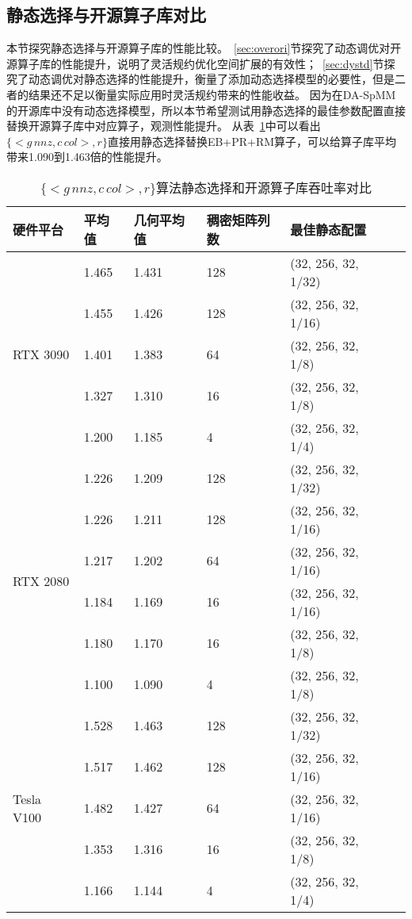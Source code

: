 \subsection{静态选择与开源算子库对比}
本节探究静态选择与开源算子库的性能比较。~\ref{sec:overori}节探究了动态调优对开源算子库的性能提升，说明了灵活规约优化空间扩展的有效性；~\ref{sec:dystd}节探究了动态调优对静态选择的性能提升，衡量了添加动态选择模型的必要性，但是二者的结果还不足以衡量实际应用时灵活规约带来的性能收益。
因为在DA-SpMM的开源库中没有动态选择模型，所以本节希望测试用静态选择的最佳参数配置直接替换开源算子库中对应算子，观测性能提升。
从表~\ref{tab:sta-ori-eb}中可以看出$\{<g\,nnz , c\,col>,r\}$直接用静态选择替换EB+PR+RM算子，可以给算子库平均带来1.090到1.463倍的性能提升。
\begin{table}
  \centering
  \caption{$\{<g\,nnz , c\,col>,r\}$算法静态选择和开源算子库吞吐率对比}
  \begin{tabular}{llllll}
  \toprule
  硬件平台 & 平均值 & 几何平均值  & 稠密矩阵列数 & 最佳静态配置 \\
  \midrule
  \multirow{5}{*}{RTX 3090}& 1.465 & 1.431  & 128 & (32, 256, 32, 1/32)\\
                           & 1.455 & 1.426  & 128 & (32, 256, 32, 1/16)\\
                           & 1.401 & 1.383  & 64 & (32, 256, 32, 1/8)\\
                           & 1.327 & 1.310  & 16 & (32, 256, 32, 1/8)\\
                           & 1.200 & 1.185  & 4 & (32, 256, 32, 1/4)\\
  \hline
  \multirow{6}{*}{RTX 2080}& 1.226 & 1.209 & 128 & (32, 256, 32, 1/32)\\
                           & 1.226 & 1.211 & 128 & (32, 256, 32, 1/16)\\
                           & 1.217 & 1.202 & 64 & (32, 256, 32, 1/16)\\
                           & 1.184 & 1.169 & 16 & (32, 256, 32, 1/16)\\
                           & 1.180 & 1.170  & 16& (32, 256, 32, 1/8)\\
                           & 1.100 & 1.090  & 4 & (32, 256, 32, 1/8)\\
  \hline
  \multirow{5}{*}{Tesla V100}& 1.528 & 1.463 & 128 & (32, 256, 32, 1/32)\\
                             & 1.517 & 1.462 & 128 & (32, 256, 32, 1/16)\\
                             & 1.482 & 1.427  & 64 & (32, 256, 32, 1/16)\\
                             & 1.353 & 1.316  & 16 & (32, 256, 32, 1/8)\\
                             & 1.166 & 1.144  & 4 & (32, 256, 32, 1/4)\\
  \bottomrule
  \end{tabular}
  \label{tab:sta-ori-eb}
\end{table}
